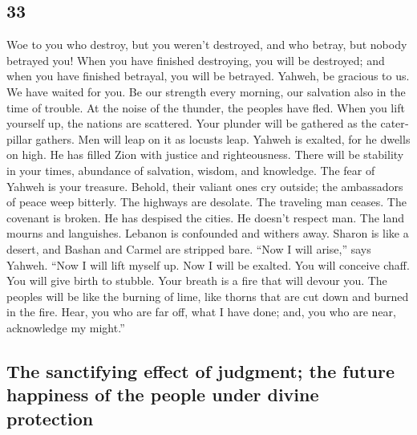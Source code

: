 \begin{paracol}{2}
\begin{otherlanguage}{english}
\hypertarget{section-65}{%
\section{33}\label{section-65}}

 Woe to you who destroy, but you weren't destroyed, and
who betray, but nobody betrayed you! When you have finished destroying,
you will be destroyed; and when you have finished betrayal, you will be
betrayed.  Yahweh, be gracious to us. We have waited for
you. Be our strength every morning, our salvation also in the time of
trouble.  At the noise of the thunder, the peoples have
fled. When you lift yourself up, the nations are scattered.
 Your plunder will be gathered as the caterpillar gathers.
Men will leap on it as locusts leap.  Yahweh is exalted,
for he dwells on high. He has filled Zion with justice and
righteousness.  There will be stability in your times,
abundance of salvation, wisdom, and knowledge. The fear of Yahweh is
your treasure.  Behold, their valiant ones cry outside;
the ambassadors of peace weep bitterly.  The highways are
desolate. The traveling man ceases. The covenant is broken. He has
despised the cities. He doesn't respect man.  The land
mourns and languishes. Lebanon is confounded and withers away. Sharon is
like a desert, and Bashan and Carmel are stripped bare. 
``Now I will arise,'' says Yahweh. ``Now I will lift myself up. Now I
will be exalted.  You will conceive chaff. You will give
birth to stubble. Your breath is a fire that will devour you.
 The peoples will be like the burning of lime, like
thorns that are cut down and burned in the fire.  Hear,
you who are far off, what I have done; and, you who are near,
acknowledge my might.''

\hypertarget{the-sanctifying-effect-of-judgment-the-future-happiness-of-the-people-under-divine-protection}{%
\subsection{The sanctifying effect of judgment; the future happiness of
the people under divine
protection}\label{the-sanctifying-effect-of-judgment-the-future-happiness-of-the-people-under-divine-protection}}


\end{otherlanguage}
\end{paracol}
